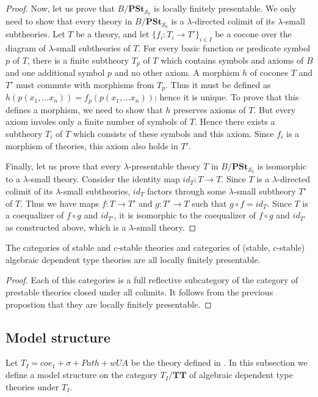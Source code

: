 \documentclass[reqno]{amsart}
\theoremstyle{definition}
\theoremstyle{remark}
\newcommand{\cat}[1]{\mathbf{#1}}
\newcommand{\PSt}{\cat{PSt}}
\newcommand{\algtt}{\cat{TT}}
\numberwithin{figure}{section}
\begin{document}
\begin{proof}
Now, let us prove that $B/\PSt_{\mathcal{S}_0}$ is locally finitely presentable.
We only need to show that every theory in $B/\PSt_{\mathcal{S}_0}$ is a $\lambda$-directed colimit of its $\lambda$-small subtheories.
Let $T$ be a theory, and let $\{ f_i : T_i \to T' \}_{i \in I}$ be a cocone over the diagram of $\lambda$-small subtheories of $T$.
For every basic function or predicate symbol $p$ of $T$,
there is a finite subtheory $T_p$ of $T$ which contains symbols and axioms of $B$ and one additional symbol $p$ and no other axiom.
A morphism $h$ of cocones $T$ and $T'$ must commute with morphisms from $T_p$.
Thus it must be defined as $h(p(x_1, \ldots x_n)) = f_p(p(x_1, \ldots x_n))$; hence it is unique.
To prove that this defines a morphism, we need to show that $h$ preserves axioms of $T$.
But every axiom involes only a finite number of symbols of $T$.
Hence there exists a subtheory $T_i$ of $T$ which consists of these symbols and this axiom.
Since $f_i$ is a morphism of theories, this axiom also holds in $T'$.

Finally, let us prove that every $\lambda$-presentable theory $T$ in $B/\PSt_{\mathcal{S}_0}$ is isomorphic to a $\lambda$-small theory.
Consider the identity map $id_T : T \to T$.
Since $T$ is a $\lambda$-directed colimit of its $\lambda$-small subtheories, $id_T$ factors through some $\lambda$-small subtheory $T'$ of $T$.
Thus we have maps $f : T \to T'$ and $g : T' \to T$ such that $g \circ f = id_T$.
Since $T$ is a coequalizer of $f \circ g$ and $id_{T'}$, it is isomorphic to the coequalizer of $f \circ g$ and $id_{T'}$ as constructed above, which is a $\lambda$-small theory.
\end{proof}

\begin{cor}
The categories of stable and $c$-stable theories and categories of (stable, $c$-stable) algebraic dependent type theories are all locally finitely presentable.
\end{cor}
\begin{proof}
Each of this categories is a full reflective subcategory of the category of prestable theories closed under all colimits.
It follows from the previous propostion that they are locally finitely presentable.
\end{proof}

\subsection{Model structure}

Let $T_I = coe_1 + \sigma + Path + wUA$ be the theory defined in \cite{alg-models}.
In this subsection we define a model structure on the category $T_I/\algtt$ of algebraic dependent type theories under $T_I$.
\end{document}
